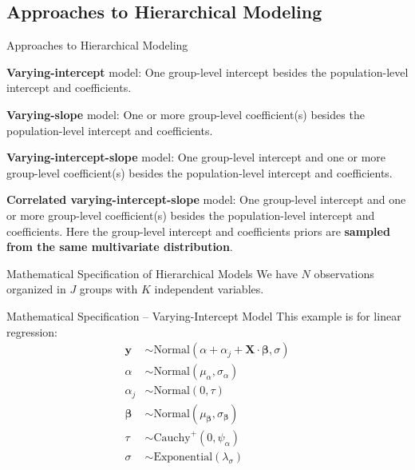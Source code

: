 \subsection{Approaches to Hierarchical Modeling}
\begin{frame}{Approaches to Hierarchical Modeling}
	\begin{vfilleditems}
		\item \textbf{Varying-intercept} model:
		One group-level intercept besides the population-level
		intercept and coefficients.
		\item \textbf{Varying-slope} model:
		One or more group-level coefficient(s) besides the population-level
		intercept and coefficients.
		\item \textbf{Varying-intercept-slope} model:
		One group-level intercept and one or more group-level coefficient(s) besides the population-level
		intercept and coefficients.
		\item \textbf{Correlated varying-intercept-slope} model:
		One group-level intercept and one or more group-level coefficient(s) besides the population-level
		intercept and coefficients.
		Here the group-level intercept and coefficients priors
		are \textbf{sampled from the same multivariate distribution}.
	\end{vfilleditems}
\end{frame}

\begin{frame}{Mathematical Specification of Hierarchical Models}
	We have $N$ observations organized in $J$ groups with $K$ independent variables.
\end{frame}

\begin{frame}{Mathematical Specification -- Varying-Intercept Model}
	This example is for linear regression:
	$$
		\begin{aligned}
			\mathbf{y}         & \sim \text{Normal}\left( \alpha + \alpha_j + \mathbf{X} \cdot \boldsymbol{\beta}, \sigma \right) \\
			\alpha             & \sim \text{Normal}(\mu_\alpha, \sigma_\alpha)                                                    \\
			\alpha_j           & \sim \text{Normal}(0, \tau)                                                                      \\
			\boldsymbol{\beta} & \sim \text{Normal}(\mu_{\boldsymbol{\beta}}, \sigma_{\boldsymbol{\beta}})                        \\
			\tau               & \sim \text{Cauchy}^+(0, \psi_{\alpha})                                                           \\
			\sigma             & \sim \text{Exponential}(\lambda_\sigma)
		\end{aligned}
	$$
\end{frame}

